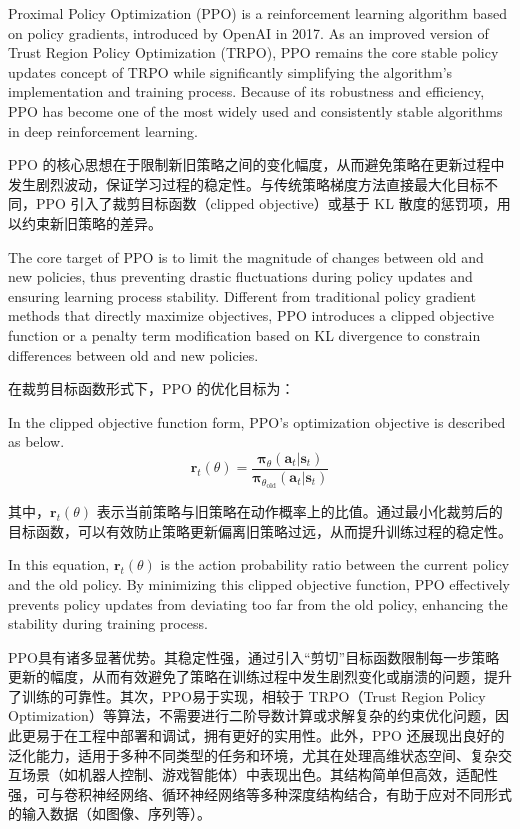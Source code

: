 Proximal Policy Optimization (PPO) is a reinforcement learning algorithm based on policy gradients\cite{yu2022surprising}, introduced by OpenAI in 2017. As an improved version of Trust Region Policy Optimization (TRPO), PPO remains the core stable policy updates concept of TRPO while significantly simplifying the algorithm's implementation and training process. Because of its robustness and efficiency, PPO has become one of the most widely used and consistently stable algorithms in deep reinforcement learning.

PPO 的核心思想在于限制新旧策略之间的变化幅度，从而避免策略在更新过程中发生剧烈波动，保证学习过程的稳定性。与传统策略梯度方法直接最大化目标不同，PPO 引入了裁剪目标函数（clipped objective）或基于 KL 散度的惩罚项，用以约束新旧策略的差异。

The core target of PPO is to limit the magnitude of changes between old and new policies, thus preventing drastic fluctuations during policy updates and ensuring learning process stability. Different from traditional policy gradient methods that directly maximize objectives, PPO introduces a clipped objective function or a penalty term modification based on KL divergence to constrain differences between old and new policies.

在裁剪目标函数形式下，PPO 的优化目标为：

In the clipped objective function form, PPO's optimization objective is described as below.
\begin{equation}
	\boldsymbol{r}_t(\theta) = \frac{\boldsymbol{\pi}_\theta(\boldsymbol{a}_t | \boldsymbol{s}_t)}{\boldsymbol{\pi}_{\theta_{\text{old}}}(\boldsymbol{a}_t | \boldsymbol{s}_t)}
\end{equation}

其中，\( \boldsymbol{r}_t(\theta) \) 表示当前策略与旧策略在动作概率上的比值。通过最小化裁剪后的目标函数，可以有效防止策略更新偏离旧策略过远，从而提升训练过程的稳定性。

In this equation, \( \boldsymbol{r}_t(\theta) \) is the action probability ratio between the current policy and the old policy. By minimizing this clipped objective function, PPO effectively prevents policy updates from deviating too far from the old policy, enhancing the stability during training process.

PPO具有诸多显著优势。其稳定性强，通过引入“剪切”目标函数限制每一步策略更新的幅度，从而有效避免了策略在训练过程中发生剧烈变化或崩溃的问题，提升了训练的可靠性。其次，PPO易于实现，相较于 TRPO（Trust Region Policy Optimization）等算法，不需要进行二阶导数计算或求解复杂的约束优化问题，因此更易于在工程中部署和调试，拥有更好的实用性。此外，PPO 还展现出良好的泛化能力，适用于多种不同类型的任务和环境，尤其在处理高维状态空间、复杂交互场景（如机器人控制、游戏智能体）中表现出色。其结构简单但高效，适配性强，可与卷积神经网络、循环神经网络等多种深度结构结合，有助于应对不同形式的输入数据（如图像、序列等）。


